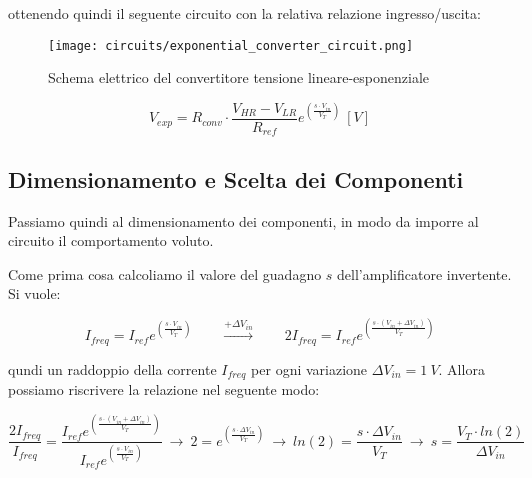 ottenendo quindi il seguente circuito con la relativa relazione ingresso/uscita:

\begin{figure}[H]
    \centering
    \texttt{[image: circuits/exponential\_converter\_circuit.png]}
    \caption{Schema elettrico del convertitore tensione lineare-esponenziale}
    \label{exponential_converter_circuit}
\end{figure}

\begin{equation}\label{expo_converter}
    V_{exp}=R_{conv}\cdot \frac{V_{HR}-V_{LR}}{R_{ref}}e^{\left(\frac{s\cdot V_{in}}{V_T}\right)}\ [V]
\end{equation}


\subsection*{Dimensionamento e Scelta dei Componenti}


Passiamo quindi al dimensionamento dei componenti, in modo da imporre al circuito il
comportamento voluto.

Come prima cosa calcoliamo il valore del guadagno $s$ dell'amplificatore invertente.
Si vuole:

\begin{equation}\label{iref_doubling}
    I_{freq}=I_{ref}e^{\left(\frac{s\cdot V_{in}}{V_T}\right)}
    \qquad
    \xrightarrow{+\Delta V_{in}}
    \qquad
    2I_{freq}=I_{ref}e^{\left(\frac{s\cdot(V_{in}+\Delta V_{in})}{V_T}\right)}
\end{equation}

qundi un raddoppio della corrente $I_{freq}$ per ogni variazione $\Delta V_{in}=1\ V$.
Allora possiamo riscrivere la relazione nel seguente modo:

\begin{equation}\label{s1}
    \frac{2I_{freq}}{I_{freq}}=
    \frac{I_{ref}e^{\left(\frac{s\cdot(V_{in}+\Delta V_{in})}{V_T}\right)}}
    {I_{ref}e^{\left(\frac{s\cdot V_{in}}{V_T}\right)}}
    \
    \rightarrow
    \
    2=e^{\left(\frac{s\cdot\Delta V_{in}}{V_T}\right)}
    \
    \rightarrow
    \
    ln(2)=\frac{s\cdot\Delta V_{in}}{V_T}
    \
    \rightarrow
    \
    s=\frac{V_T\cdot ln(2)}{\Delta V_{in}}
\end{equation}

